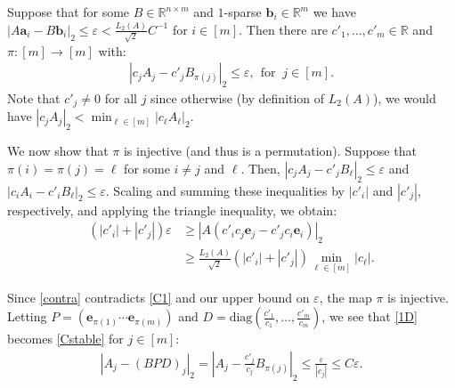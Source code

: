 \documentclass[journal, twocolumn]{IEEEtran}
\begin{document}
Suppose that for some $B \in \mathbb{R}^{n \times m}$ and $1$-sparse $\mathbf{b}_i \in \mathbb{R}^m$ we have  $|A\mathbf{a}_i - B\mathbf{b}_i|_2 \leq \varepsilon < \frac{L_2(A)}{\sqrt{2}}C^{-1}$ for $i \in [m]$. Then there are $c'_1, \ldots, c'_m \in \mathbb{R}$ and $\pi: [m] \to [m]$ with:
\begin{align}\label{1D}
|c_jA_j - c'_jB_{\pi(j)}|_2 \leq \varepsilon, \ \ \text{for } \  j \in [m].
\end{align} 
Note that $c'_j \neq 0$ for all $j$ since otherwise (by definition of $L_2(A)$), we would have $|c_jA_j|_2 < \min_{\ell \in [m]}|c_{\ell}A_{\ell}|_2$. 

We  now show that $\pi$ is injective (and thus is a permutation).
Suppose that $\pi(i) = \pi(j) = \ell$ for some $i \neq j$ and $\ell$. Then, $|c_{j}A_{j} - c'_{j}B_{\ell}|_2 \leq \varepsilon$ and $|c_{i}A_{i} - c'_{i} B_{\ell}|_2  \leq \varepsilon$. Scaling and summing these inequalities by $|c'_{i}|$ and $|c'_{j}|$, respectively, and applying the triangle inequality, we obtain:
\begin{align}\label{contra}
(|c'_{i}| + |c'_{j}|) \varepsilon
&\geq |A(c'_{i}c_{j} \mathbf{e}_{j} - c'_{j}c_{i}\mathbf{e}_{i})|_2 \nonumber \\ 
&\geq \frac{L_2(A)}{\sqrt{2}} \left( |c'_{i}| + |c'_{j}| \right) \min_{\ell \in [m]} |c_\ell |.
\end{align}
%

Since \eqref{contra} contradicts \eqref{C1} and our upper bound on $\varepsilon$, the map $\pi$ is injective. Letting $P = \left( \mathbf{e}_{\pi(1)} \cdots \mathbf{e}_{\pi(m)}\right)$ and $D = \text{diag}(\frac{c'_1}{c_1},\ldots,\frac{c'_m}{c_m})$, we see that \eqref{1D} becomes \eqref{Cstable} for $j \in [m]$:
\begin{align*}%
|A_j - (BPD)_j|_2 = |A_j - \frac{c'_j}{c_j}B_{\pi(j)}|_2 \leq \frac{\varepsilon}{|c_j|} \leq C\varepsilon.
\end{align*}

\end{document}
